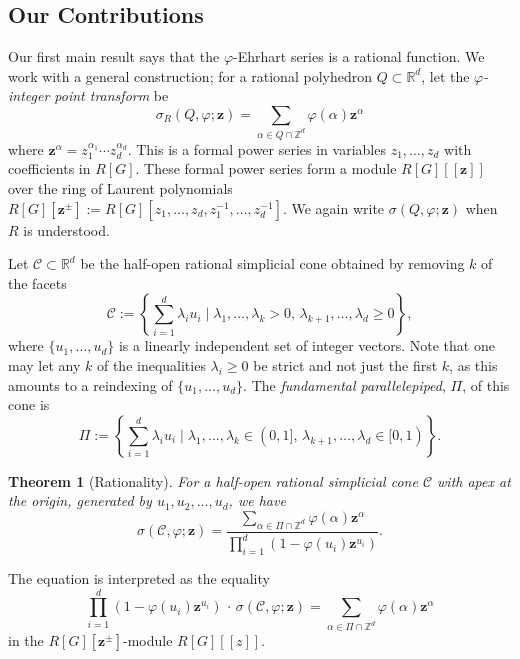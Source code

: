 \documentclass[12pt,reqno]{amsart}
\newtheorem{thm}{Theorem}[section]
\theoremstyle{definition}
\theoremstyle{remark}
\newcommand{\R}{\mathbb{R}}
\newcommand{\Z}{\mathbb{Z}}
\renewcommand{\phi}{\varphi}
\begin{document}
\subsection*{Our Contributions}
Our  first main result says that the $\phi$-Ehrhart series is a rational function.  We work with a general construction; for a rational polyhedron $Q \subset \R^d$, let the {\it $\varphi$-integer point transform} be
\[
\sigma_R(Q,\varphi;\mathbf{z}) = 
\sum_{\alpha \in Q \cap \Z^d} \varphi(\alpha)\mathbf{z}^\alpha
\]
where $\mathbf{z}^{\alpha} = z_1^{\alpha_1}\cdots z_d^{\alpha_d}$.
This is a formal power series in variables $z_1,\dots,z_d$ with coefficients in $R[G]$. These formal power series form a module $R[G][[\mathbf{z}]]$ over the ring of Laurent polynomials $R[G][\mathbf{z}^{\pm}]:=R[G][z_1,\dots,z_d,z_1^{-1},\dots,z_d^{-1}]$.
We again write $\sigma(Q,\varphi;\mathbf{z})$ when $R$ is understood. 

Let $\mathcal C\subset \R^{d}$ be the half-open rational simplicial cone obtained by removing $k$ of the facets
$$\mathcal C:=\left\{\sum_{i=1}^{d} \lambda_i u_i \mid  \lambda_1,\ldots,\lambda_k>0,\, \lambda_{k+1},\ldots,\lambda_d\geq 0\right\},$$
where $\{u_1,\dots,u_{d}\}$ is a linearly independent set of integer vectors.
Note that one may let any $k$ of the inequalities $\lambda_i \geq 0$ be strict and not just the first $k$, as this amounts to a reindexing of $\{u_1,\dots,u_d\}$.
The {\it fundamental parallelepiped}, $\Pi$, of this cone is
\begin{equation}
    \label{eqn:fundamental}
\Pi:=\left\{\sum_{i=1}^{d} \lambda_i u_i \mid   \lambda_1,\ldots,\lambda_k\in (0,1],\, \lambda_{k+1},\ldots,\lambda_d \in [0,1)\right\}.
\end{equation} 

\begin{thm}[Rationality]
\label{lem:brion_group}
For a half-open rational simplicial cone $\mathcal{C}$ with apex at the origin, generated by $u_1,u_2,\ldots,u_d$, we have
\[
\sigma(\mathcal{C}, \varphi; \mathbf{z}) =   \frac{\sum_{\alpha \in \Pi\cap\Z^{d}} \varphi(\alpha) \mathbf{z}^\alpha}{\prod_{i=1}^{d}(1-\varphi(u_i)\mathbf{z}^{u_i})}.
\]
\end{thm}

The equation is interpreted as the equality \[
\prod_{i=1}^{d}(1-\varphi(u_i)\mathbf{z}^{u_i})\, \cdot \,\sigma(\mathcal{C}, \varphi; \mathbf{z}) = \sum_{\alpha \in \Pi\cap \Z^d} \varphi(\alpha) \mathbf{z}^\alpha\]
in the $R[G][\mathbf{z}^{\pm}]$-module $R[G][[z]]$. 
\end{document}
